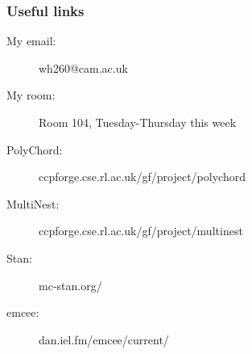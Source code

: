 \documentclass[%
]{beamer}
\begin{document}
\begin{frame}
    \frametitle{Useful links}
    \begin{description}
        \item[My email:] wh260@cam.ac.uk
        \item[My room:] Room 104, Tuesday-Thursday this week
        \item[PolyChord:] ccpforge.cse.rl.ac.uk/gf/project/polychord
        \item[MultiNest:] ccpforge.cse.rl.ac.uk/gf/project/multinest
        \item[Stan:] mc-stan.org/
        \item[emcee:] dan.iel.fm/emcee/current/
    \end{description}
\end{frame}
\end{document}
